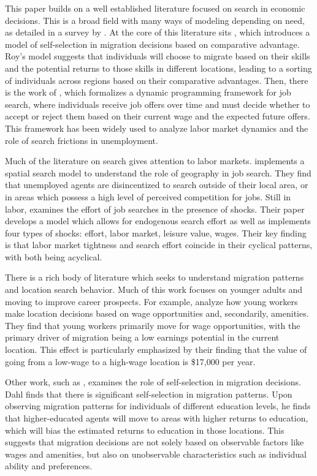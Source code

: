 \documentclass[11pt,a4paper]{article}
\begin{document}
This paper builds on a well established literature focused on search in economic decisions. This is a broad field with many ways of modeling depending on need, as detailed in a survey by \cite{chade_sorting_2017}. At the core of this literature sits \cite{roy_thoughts_1951}, which introduces a model of self-selection in migration decisions based on comparative advantage. Roy's model suggests that individuals will choose to migrate based on their skills and the potential returns to those skills in different locations, leading to a sorting of individuals across regions based on their comparative advantages. Then, there is the work of \cite{lippman_job_1976}, which formalizes a dynamic programming framework for job search, where individuals receive job offers over time and must decide whether to accept or reject them based on their current wage and the expected future offers. This framework has been widely used to analyze labor market dynamics and the role of search frictions in unemployment.

Much of the literature on search gives attention to labor markets. \cite{manning_how_2017} implements a spatial search model to understand the role of geography in job search. They find that unemployed agents are disincentized to search outside of their local area, or in areas which possess a high level of perceived competition for jobs. Still in labor, \cite{cenesiz_cyclicality_2022} examines the effort of job searches in the presence of shocks. Their paper develops a model which allows for endogenous search effort as well as implements four types of shocks: effort, labor market, leisure value, wages. Their key finding is that labor market tightness and search effort coincide in their cyclical patterns, with both being acyclical. 

There is a rich body of literature which seeks to understand migration patterns and location search behavior. Much of this work focuses on younger adults and moving to improve career prospects. For example, \cite{kennan_effect_2011} analyze how young workers make location decisions based on wage opportunities and, secondarily, amenities. They find that young workers primarily move for wage opportunities, with the primary driver of migration being a low earnings potential in the current location. This effect is particularly emphasized by their finding that the value of going from a low-wage to a high-wage location is \$17,000 per year.

Other work, such as \cite{dahl_mobility_2002}, examines the role of self-selection in migration decisions. Dahl finds that there is significant self-selection in migration patterns. Upon observing migration patterns for individuals of different education levels, he finds that higher-educated agents will move to areas with higher returns to education, which will bias the estimated returns to education in those locations. This suggests that migration decisions are not solely based on observable factors like wages and amenities, but also on unobservable characteristics such as individual ability and preferences.
\end{document}
